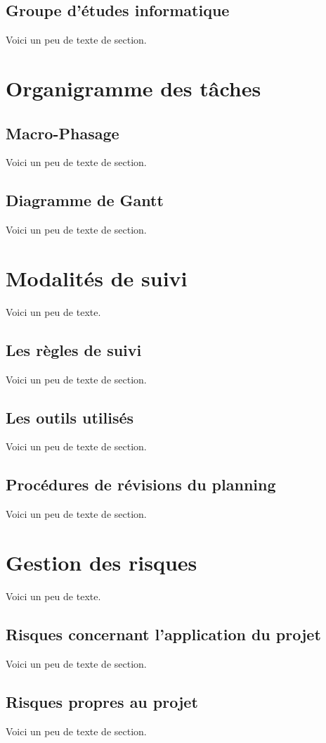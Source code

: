     \subsection{Groupe d'études informatique}
    Voici un peu de texte de section.
    
    \section{Organigramme des tâches}
    \subsection{Macro-Phasage}
    Voici un peu de texte de section.
    \subsection{Diagramme de Gantt}
    Voici un peu de texte de section.
    
    \section{Modalités de suivi}
    Voici un peu de texte.
    \subsection{Les règles de suivi}
    Voici un peu de texte de section.
    \subsection{Les outils utilisés}
    Voici un peu de texte de section.
    \subsection{Procédures de révisions du planning}
    Voici un peu de texte de section.
    
    \section{Gestion des risques}
    Voici un peu de texte.
    \subsection{Risques concernant l'application du projet}
    Voici un peu de texte de section.
    \subsection{Risques propres au projet}
    Voici un peu de texte de section.
    

